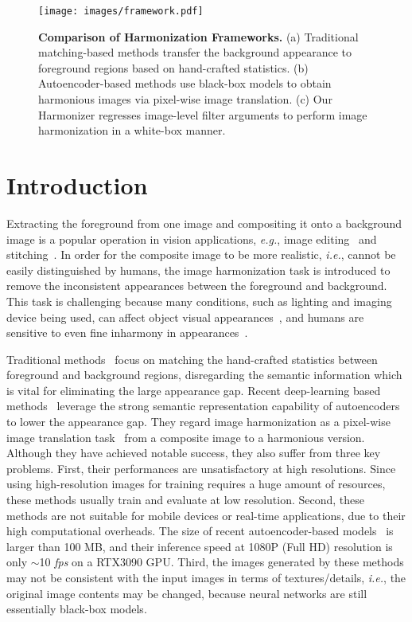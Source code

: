 \documentclass[runningheads]{llncs}
\newcommand{\ke}[1]{{\color{black}#1}}
\begin{document}
 \begin{figure}[t]
\centering
\texttt{[image: images/framework.pdf]}
{\begin{center}
\vspace{-0.5cm}
\caption{\textbf{Comparison of Harmonization Frameworks.} (a) Traditional matching-based methods transfer the background appearance to foreground regions based on hand-crafted statistics. (b) Autoencoder-based methods use black-box models to obtain harmonious images via pixel-wise image translation. (c) Our Harmonizer regresses image-level filter arguments to perform image harmonization in a white-box manner.}
\label{fig:framework}
\end{center}
}
\vspace{-0.9cm}
\end{figure}

\section{Introduction}
Extracting the foreground from one image and compositing it onto a background image is a popular operation in vision applications, \textit{e.g.}, image editing~\cite{IHGD2,PatchMatch} and stitching~\cite{ImageStitching1,ImageStitching2}. In order for the composite image to be more realistic, {\it i.e.}, cannot be easily distinguished by humans, the image harmonization task is introduced to remove the \ke{inconsistent} appearances between the foreground and background. This task is challenging because many conditions, such as lighting and imaging device being used, can affect object visual appearances~\cite{SFS,SIRS}, and humans are sensitive to even fine inharmony in appearances~\cite{IHHV1,IHCD4}. 

Traditional methods~\cite{Zhu_2015_ICCV,IHCD1,IHCT1,IHGD1,IHHV1,IHMS1,DPH} focus on matching the hand-crafted statistics between foreground and background regions, disregarding the semantic information which is vital for eliminating the large appearance gap. Recent deep-learning based methods~\cite{DIH,DoveNet,IHADFM,TVH,FASRIH,SSH,TransformerIH} leverage the strong semantic representation capability of autoencoders~\cite{UNet} to lower the appearance gap.
They regard image harmonization as a pixel-wise image translation task~\cite{pix2pix,pix2pixHD} from a \ke{composite} image to a harmonious version. Although they have achieved notable success, they also suffer from three key problems. 
First, their performances are unsatisfactory at high resolutions. Since using high-resolution images for training requires a huge amount of resources, these methods usually train and evaluate at low resolution.
Second, these methods are not suitable for mobile devices or real-time applications, due to their high computational overheads. The size of recent  autoencoder-based models~\cite{DoveNet,RAIN,BargainNet,IntrinsicIH} is larger than 100 MB, and their inference speed at 1080P (Full HD) resolution is only $\sim$10 {\it fps} on a RTX3090 GPU.  
Third, the images generated by these methods may not be consistent with the input images in terms of textures/details, {\it i.e.}, the original image contents may be changed, because neural networks are still essentially black-box
models. 
\end{document}
